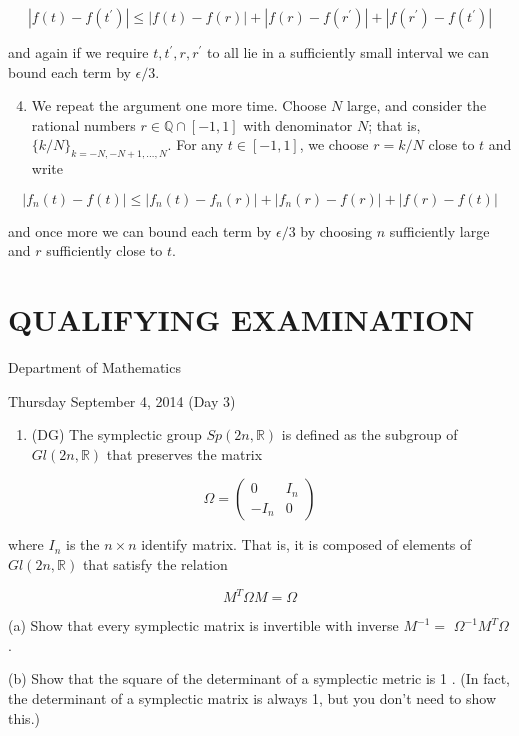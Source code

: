 \documentclass[10pt]{article}
\begin{document}
$$
\left|f(t)-f\left(t^{\prime}\right)\right| \leq|f(t)-f(r)|+\left|f(r)-f\left(r^{\prime}\right)\right|+\left|f\left(r^{\prime}\right)-f\left(t^{\prime}\right)\right|
$$

and again if we require $t, t^{\prime}, r, r^{\prime}$ to all lie in a sufficiently small interval we can bound each term by $\epsilon / 3$.

\begin{enumerate}
  \setcounter{enumi}{3}
  \item We repeat the argument one more time. Choose $N$ large, and consider the rational numbers $r \in \mathbb{Q} \cap[-1,1]$ with denominator $N$; that is, $\{k / N\}_{k=-N,-N+1, \ldots, N}$. For any $t \in[-1,1]$, we choose $r=k / N$ close to $t$ and write
\end{enumerate}

$$
\left|f_{n}(t)-f(t)\right| \leq\left|f_{n}(t)-f_{n}(r)\right|+\left|f_{n}(r)-f(r)\right|+|f(r)-f(t)|
$$

and once more we can bound each term by $\epsilon / 3$ by choosing $n$ sufficiently large and $r$ sufficiently close to $t$.

\section*{QUALIFYING EXAMINATION }
Department of Mathematics

Thursday September 4, 2014 (Day 3)

\begin{enumerate}
  \item (DG) The symplectic group $S p(2 n, \mathbb{R})$ is defined as the subgroup of $G l(2 n, \mathbb{R})$ that preserves the matrix
\end{enumerate}

$$
\Omega=\left(\begin{array}{cc}
0 & I_{n} \\
-I_{n} & 0
\end{array}\right)
$$

where $I_{n}$ is the $n \times n$ identify matrix. That is, it is composed of elements of $G l(2 n, \mathbb{R})$ that satisfy the relation

$$
M^{T} \Omega M=\Omega
$$

(a) Show that every symplectic matrix is invertible with inverse $M^{-1}=$ $\Omega^{-1} M^{T} \Omega$.

(b) Show that the square of the determinant of a symplectic metric is 1 . (In fact, the determinant of a symplectic matrix is always 1, but you don't need to show this.)
\end{document}
